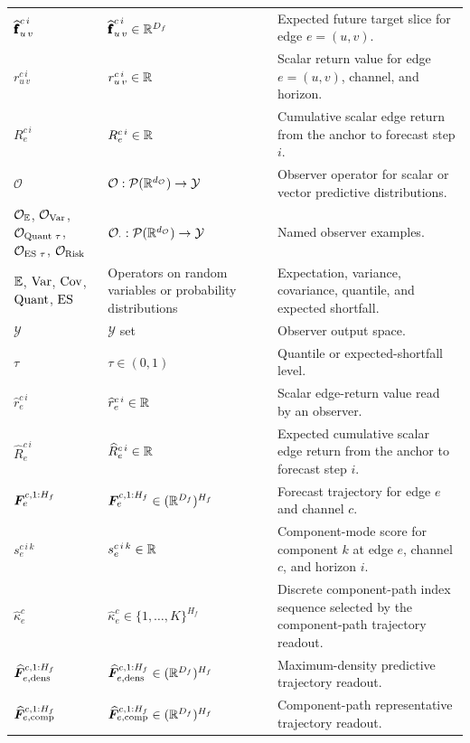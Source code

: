 \begin{center}
\begin{longtable}{>{\raggedright\arraybackslash}p{}
                  >{\raggedright\arraybackslash}p{}
                  >{\raggedright\arraybackslash}p{}}
$\widehat{\pmb{\mathbf{f}}}_{u\,v}^{c\,i}$ & $\widehat{\pmb{\mathbf{f}}}_{u\,v}^{c\,i} \in \mathbb{R}^{D_f}$ & Expected future target slice for edge $e=(u,v)$. \\
$r_{u\,v}^{c\,i}$ & $r_{u\,v}^{c\,i} \in \mathbb{R}$ & Scalar return value for edge $e=(u,v)$, channel, and horizon. \\
$R_e^{c\,i}$ & $R_e^{c\,i}\in\mathbb{R}$ & Cumulative scalar edge return from the anchor to forecast step $i$. \\
\midrule
$\mathcal{O}$ & $\mathcal{O}:\mathcal{P}(\mathbb{R}^{d_{\mathcal{O}}})\rightarrow\mathcal{Y}$ & Observer operator for scalar or vector predictive distributions. \\
$\mathcal{O}_{\mathbb{E}}$, $\mathcal{O}_{\operatorname{Var}}$, $\mathcal{O}_{\operatorname{Quant}\,\tau}$, $\mathcal{O}_{\operatorname{ES}\,\tau}$, $\mathcal{O}_{\operatorname{Risk}}$ & $\mathcal{O}_{\cdot}:\mathcal{P}(\mathbb{R}^{d_{\mathcal{O}}})\rightarrow\mathcal{Y}$ & Named observer examples. \\
$\mathbb{E}$, $\operatorname{Var}$, $\operatorname{Cov}$, $\operatorname{Quant}$, $\operatorname{ES}$ & Operators on random variables or probability distributions & Expectation, variance, covariance, quantile, and expected shortfall. \\
$\mathcal{Y}$ & $\mathcal{Y}$ set & Observer output space. \\
$\tau$ & $\tau \in (0,1)$ & Quantile or expected-shortfall level. \\
$\widehat{r}_{e}^{c\,i}$ & $\widehat{r}_{e}^{c\,i} \in \mathbb{R}$ & Scalar edge-return value read by an observer. \\
$\widehat{R}_{e}^{c\,i}$ & $\widehat{R}_{e}^{c\,i}\in\mathbb{R}$ & Expected cumulative scalar edge return from the anchor to forecast step $i$. \\
$\bm{F}_{e}^{c,1:H_f}$ & $\bm{F}_{e}^{c,1:H_f}\in(\mathbb{R}^{D_f})^{H_f}$ & Forecast trajectory for edge $e$ and channel $c$. \\
$s_{e}^{c\,i\,k}$ & $s_{e}^{c\,i\,k}\in\mathbb{R}$ & Component-mode score for component $k$ at edge $e$, channel $c$, and horizon $i$. \\
$\widehat{\kappa}_{e}^{c}$ & $\widehat{\kappa}_{e}^{c}\in\{1,\ldots,K\}^{H_f}$ & Discrete component-path index sequence selected by the component-path trajectory readout. \\
$\widehat{\bm{F}}_{e,\mathrm{dens}}^{c,1:H_f}$ & $\widehat{\bm{F}}_{e,\mathrm{dens}}^{c,1:H_f}\in(\mathbb{R}^{D_f})^{H_f}$ & Maximum-density predictive trajectory readout. \\
$\widehat{\bm{F}}_{e,\mathrm{comp}}^{c,1:H_f}$ & $\widehat{\bm{F}}_{e,\mathrm{comp}}^{c,1:H_f}\in(\mathbb{R}^{D_f})^{H_f}$ & Component-path representative trajectory readout. \\

\end{longtable}
\end{center}
